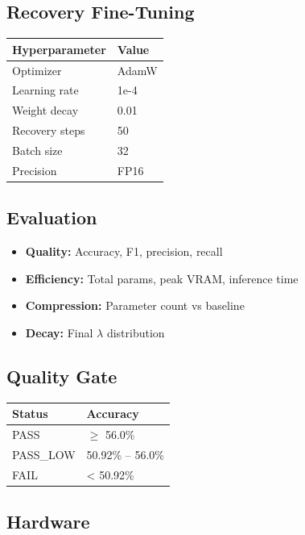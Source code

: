 \subsection{Recovery Fine-Tuning}

\begin{table}[H]
\centering
\small
\begin{tabular}{ll}
\toprule
\textbf{Hyperparameter} & \textbf{Value} \\
\midrule
Optimizer & AdamW \\
Learning rate & 1e-4 \\
Weight decay & 0.01 \\
Recovery steps & 50 \\
Batch size & 32 \\
Precision & FP16 \\
\bottomrule
\end{tabular}
\end{table}

\subsection{Evaluation}

\begin{itemize}
\item \textbf{Quality:} Accuracy, F1, precision, recall
\item \textbf{Efficiency:} Total params, peak VRAM, inference time
\item \textbf{Compression:} Parameter count vs baseline
\item \textbf{Decay:} Final $\lambda$ distribution

\end{itemize}
\subsection{Quality Gate}

\begin{table}[H]
\centering
\small
\begin{tabular}{ll}
\toprule
\textbf{Status} & \textbf{Accuracy} \\
\midrule
PASS & $\ge$ 56.0\% \\
PASS\_LOW & 50.92\% -- 56.0\% \\
FAIL & < 50.92\% \\
\bottomrule
\end{tabular}
\end{table}

\subsection{Hardware}


